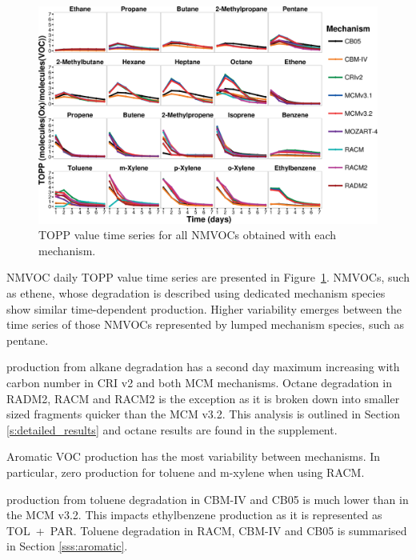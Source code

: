 \begin{figure}
    \centering
    \includegraphics[width=\textwidth]{img/TOPP_daily_values_all_species}
    \vspace{0mm}
    \caption{TOPP value time series for all NMVOCs obtained with each mechanism.}
    \vspace{-4mm}
    \label{f:TOPP_dailies}
\end{figure}

NMVOC daily TOPP value time series are presented in \mbox{Figure \ref{f:TOPP_dailies}}. 
NMVOCs, such as ethene, whose degradation is described using dedicated mechanism species show similar time-dependent  production.
Higher variability emerges between the time series of those NMVOCs represented by lumped mechanism species, such as pentane.

 production from alkane degradation has a second day maximum increasing with carbon number in CRI v2 and both MCM mechanisms.
Octane degradation in RADM2, RACM and RACM2 is the exception as it is broken down into smaller sized fragments quicker than the MCM v3.2.
This analysis is outlined in Section \ref{s:detailed_results} and octane results are found in the supplement.

Aromatic VOC  production has the most variability between mechanisms. 
In particular, zero  production for toluene and m-xylene when using RACM.

 production from toluene degradation in CBM-IV and CB05 is much lower than in the MCM v3.2.
This impacts ethylbenzene  production as it is represented as \mbox{TOL + PAR}. 
Toluene degradation in RACM, CBM-IV and CB05 is summarised in Section \ref{sss:aromatic}.  

